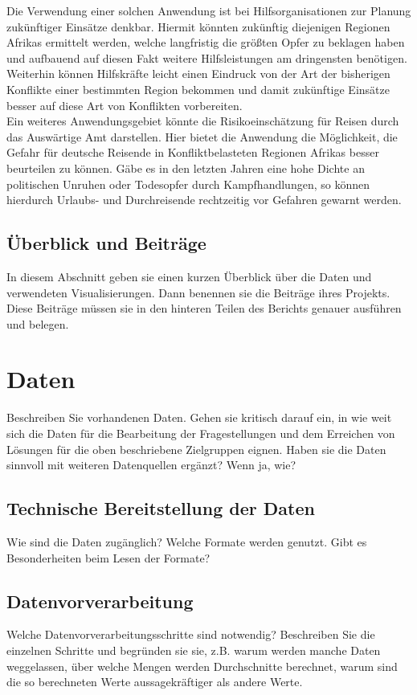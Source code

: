 \documentclass[usegeometry=true]{scrartcl}
\begin{document}
Die Verwendung einer solchen Anwendung ist bei Hilfsorganisationen zur Planung zukünftiger Einsätze denkbar. Hiermit könnten zukünftig diejenigen Regionen Afrikas ermittelt werden, welche langfristig die größten Opfer zu beklagen haben und aufbauend auf diesen Fakt weitere Hilfsleistungen am dringensten benötigen. Weiterhin können Hilfskräfte leicht einen Eindruck von der Art der bisherigen Konflikte einer bestimmten Region bekommen und damit zukünftige Einsätze besser auf diese Art von Konflikten vorbereiten.\\

Ein weiteres Anwendungsgebiet könnte die Risikoeinschätzung für Reisen durch das Auswärtige Amt darstellen. Hier bietet die Anwendung die Möglichkeit, die Gefahr für deutsche Reisende in Konfliktbelasteten Regionen Afrikas besser beurteilen zu können. Gäbe es in den letzten Jahren eine hohe Dichte an politischen Unruhen oder Todesopfer durch Kampfhandlungen, so können hierdurch Urlaubs- und Durchreisende rechtzeitig vor Gefahren gewarnt werden.

\subsection{Überblick und Beiträge}
In diesem Abschnitt geben sie einen kurzen Überblick über die Daten und verwendeten Visualisierungen. Dann benennen sie die Beiträge ihres Projekts. Diese Beiträge müssen sie in den hinteren Teilen des Berichts genauer ausführen und belegen.

\section{Daten}
Beschreiben Sie vorhandenen Daten. Gehen sie kritisch darauf ein, in wie weit sich die Daten für die Bearbeitung der Fragestellungen und dem Erreichen von Lösungen für die oben beschriebene Zielgruppen eignen. Haben sie die Daten sinnvoll mit weiteren Datenquellen ergänzt? Wenn ja, wie?
\subsection{Technische Bereitstellung der Daten}
Wie sind die Daten zugänglich? Welche Formate werden genutzt. Gibt es Besonderheiten beim Lesen der Formate?
\subsection{Datenvorverarbeitung}
Welche Datenvorverarbeitungsschritte sind notwendig? Beschreiben Sie die einzelnen Schritte und begründen sie sie, z.B. warum werden manche Daten weggelassen, über welche Mengen werden Durchschnitte berechnet, warum sind die so berechneten Werte aussagekräftiger als andere Werte. 
\end{document}
